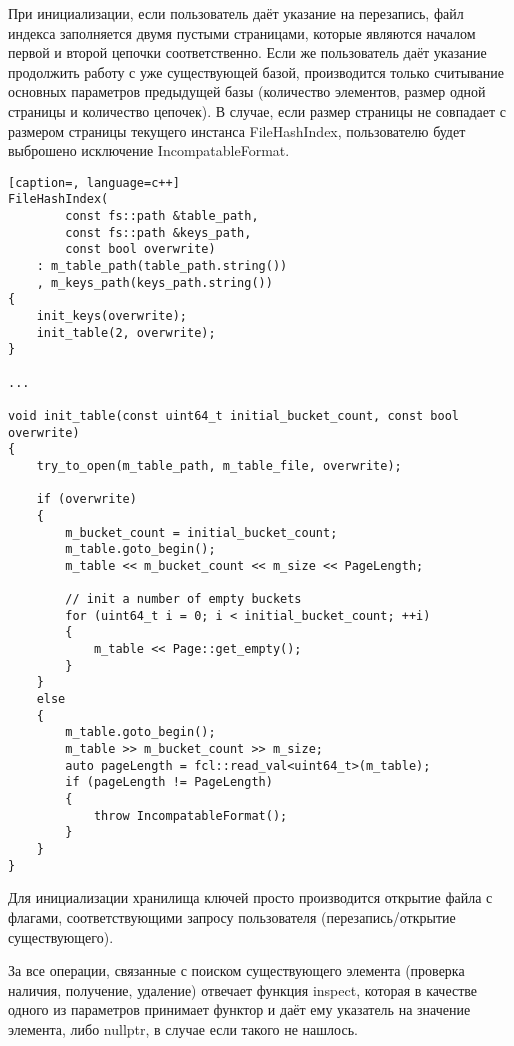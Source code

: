 \documentclass[12pt, a4paper]{fallen_report}
\begin{document}
При инициализации, если пользователь даёт указание на перезапись, файл индекса заполняется двумя пустыми страницами, которые являются началом первой и второй цепочки соответственно. Если же пользователь даёт указание продолжить работу с уже существующей базой, производится только считывание основных параметров предыдущей базы (количество элементов, размер одной страницы и количество цепочек). В случае, если размер страницы не совпадает с размером страницы текущего инстанса FileHashIndex, пользователю будет выброшено исключение IncompatableFormat.
\begin{lstlisting}[caption=, language=c++]
FileHashIndex(
        const fs::path &table_path,
        const fs::path &keys_path,
        const bool overwrite)
    : m_table_path(table_path.string())
    , m_keys_path(keys_path.string()) 
{
    init_keys(overwrite);
    init_table(2, overwrite);
}

...

void init_table(const uint64_t initial_bucket_count, const bool overwrite) 
{
    try_to_open(m_table_path, m_table_file, overwrite);

    if (overwrite) 
    {
        m_bucket_count = initial_bucket_count;
        m_table.goto_begin();
        m_table << m_bucket_count << m_size << PageLength;

        // init a number of empty buckets
        for (uint64_t i = 0; i < initial_bucket_count; ++i) 
        {
            m_table << Page::get_empty();
        }
    }
    else 
    {
        m_table.goto_begin();
        m_table >> m_bucket_count >> m_size;
        auto pageLength = fcl::read_val<uint64_t>(m_table);
        if (pageLength != PageLength) 
        {
            throw IncompatableFormat();
        }
    }
}
\end{lstlisting}

Для инициализации хранилища ключей просто производится открытие файла с флагами, соответствующими запросу пользователя (перезапись/открытие существующего).

За все операции, связанные с поиском существующего элемента (проверка наличия, получение, удаление) отвечает функция inspect, которая в качестве одного из параметров принимает функтор и даёт ему указатель на значение элемента, либо {\consolas nullptr}, в случае если такого не нашлось.
\end{document}
